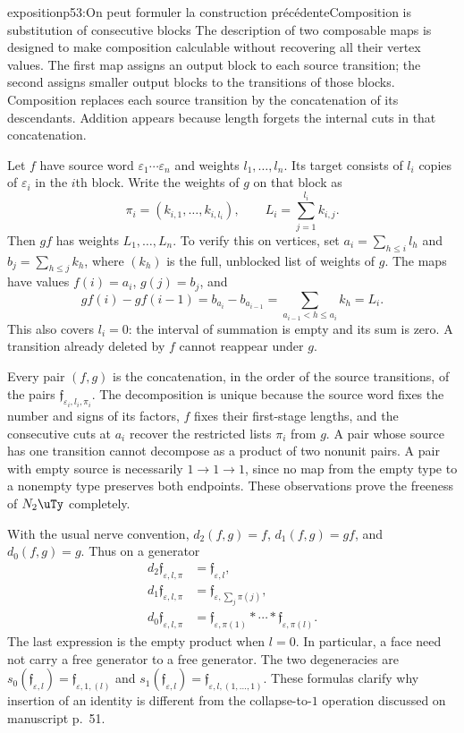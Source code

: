 \begin{dcomment}{exposition}{p53:On peut formuler la construction précédente}{Composition is substitution of consecutive blocks}
The description of two composable maps is designed to make composition calculable without recovering all their vertex values. The first map assigns an output block to each source transition; the second assigns smaller output blocks to the transitions of those blocks. Composition replaces each source transition by the concatenation of its descendants. Addition appears because length forgets the internal cuts in that concatenation.

Let $f$ have source word $\varepsilon_1\cdots\varepsilon_n$ and weights $l_1,\ldots,l_n$. Its target consists of $l_i$ copies of $\varepsilon_i$ in the $i$th block. Write the weights of $g$ on that block as
\[
 \pi_i=(k_{i,1},\ldots,k_{i,l_i}),
 \qquad L_i=\sum_{j=1}^{l_i} k_{i,j}.
\]
Then $gf$ has weights $L_1,\ldots,L_n$. To verify this on vertices, set $a_i=\sum_{h\leq i}l_h$ and $b_j=\sum_{h\leq j}k_h$, where $(k_h)$ is the full, unblocked list of weights of $g$. The maps have values $f(i)=a_i$, $g(j)=b_j$, and
\[
 gf(i)-gf(i-1)=b_{a_i}-b_{a_{i-1}}
 =\sum_{a_{i-1}<h\leq a_i}k_h=L_i.
\]
This also covers $l_i=0$: the interval of summation is empty and its sum is zero. A transition already deleted by $f$ cannot reappear under $g$.

Every pair $(f,g)$ is the concatenation, in the order of the source transitions, of the pairs $\mathfrak f_{\varepsilon_i,l_i,\pi_i}$. The decomposition is unique because the source word fixes the number and signs of its factors, $f$ fixes their first-stage lengths, and the consecutive cuts at $a_i$ recover the restricted lists $\pi_i$ from $g$. A pair whose source has one transition cannot decompose as a product of two nonunit pairs. A pair with empty source is necessarily $1\to1\to1$, since no map from the empty type to a nonempty type preserves both endpoints. These observations prove the freeness of $N_2\uTy$ completely.

With the usual nerve convention, $d_2(f,g)=f$, $d_1(f,g)=gf$, and $d_0(f,g)=g$. Thus on a generator
\[
 \begin{aligned}
 d_2\mathfrak f_{\varepsilon,l,\pi}&=\mathfrak f_{\varepsilon,l},\\
 d_1\mathfrak f_{\varepsilon,l,\pi}&=\mathfrak f_{\varepsilon,\sum_j\pi(j)},\\
 d_0\mathfrak f_{\varepsilon,l,\pi}
 &=\mathfrak f_{\varepsilon,\pi(1)}*\cdots*
   \mathfrak f_{\varepsilon,\pi(l)}.
 \end{aligned}
\]
The last expression is the empty product when $l=0$. In particular, a face need not carry a free generator to a free generator. The two degeneracies are $s_0(\mathfrak f_{\varepsilon,l})=\mathfrak f_{\varepsilon,1,(l)}$ and $s_1(\mathfrak f_{\varepsilon,l})=\mathfrak f_{\varepsilon,l,(1,\ldots,1)}$. These formulas clarify why insertion of an identity is different from the collapse-to-$1$ operation discussed on manuscript p.~51.
\end{dcomment}

